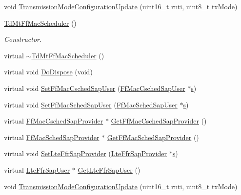 \begin{DoxyCompactItemize}
\item 
void \hyperlink{classns3_1_1TdMtFfMacScheduler_a4a7e533cdbdcd63c563baf201afee0ec}{Transmission\+Mode\+Configuration\+Update} (uint16\+\_\+t rnti, uint8\+\_\+t tx\+Mode)
\item 
\hyperlink{classns3_1_1TdMtFfMacScheduler_af9f1e76d9488fd5ea9add89d574cb90f}{Td\+Mt\+Ff\+Mac\+Scheduler} ()
\begin{DoxyCompactList}\small\item\em Constructor. \end{DoxyCompactList}\item 
virtual \hyperlink{classns3_1_1TdMtFfMacScheduler_a1ef4dda17f470bfb6e0c469afb0afc8a}{$\sim$\+Td\+Mt\+Ff\+Mac\+Scheduler} ()
\item 
virtual void \hyperlink{classns3_1_1TdMtFfMacScheduler_a7df4d0ac1213509b95b3b5b6b9b6c92b}{Do\+Dispose} (void)
\item 
virtual void \hyperlink{classns3_1_1TdMtFfMacScheduler_a274ba68426303c1a6917e959d6a51ce4}{Set\+Ff\+Mac\+Csched\+Sap\+User} (\hyperlink{classns3_1_1FfMacCschedSapUser}{Ff\+Mac\+Csched\+Sap\+User} $\ast$\hyperlink{generate__test__data__lte__sinr_8m_ad83eeb3a142285d1243a08c6b7026df8}{s})
\item 
virtual void \hyperlink{classns3_1_1TdMtFfMacScheduler_a55c35d3a14b61b7389fb108ef052b703}{Set\+Ff\+Mac\+Sched\+Sap\+User} (\hyperlink{classns3_1_1FfMacSchedSapUser}{Ff\+Mac\+Sched\+Sap\+User} $\ast$\hyperlink{generate__test__data__lte__sinr_8m_ad83eeb3a142285d1243a08c6b7026df8}{s})
\item 
virtual \hyperlink{classns3_1_1FfMacCschedSapProvider}{Ff\+Mac\+Csched\+Sap\+Provider} $\ast$ \hyperlink{classns3_1_1TdMtFfMacScheduler_a0bfda5d3c4f6d916b5e929d79570c4f4}{Get\+Ff\+Mac\+Csched\+Sap\+Provider} ()
\item 
virtual \hyperlink{classns3_1_1FfMacSchedSapProvider}{Ff\+Mac\+Sched\+Sap\+Provider} $\ast$ \hyperlink{classns3_1_1TdMtFfMacScheduler_a5640f91f6f8ab8b714d917abcbc0bb57}{Get\+Ff\+Mac\+Sched\+Sap\+Provider} ()
\item 
virtual void \hyperlink{classns3_1_1TdMtFfMacScheduler_a50c7fda519f75bdf1ab70509f6bd6cef}{Set\+Lte\+Ffr\+Sap\+Provider} (\hyperlink{classns3_1_1LteFfrSapProvider}{Lte\+Ffr\+Sap\+Provider} $\ast$\hyperlink{generate__test__data__lte__sinr_8m_ad83eeb3a142285d1243a08c6b7026df8}{s})
\item 
virtual \hyperlink{classns3_1_1LteFfrSapUser}{Lte\+Ffr\+Sap\+User} $\ast$ \hyperlink{classns3_1_1TdMtFfMacScheduler_ad303c6a5908f40eab1bea273d5199fc5}{Get\+Lte\+Ffr\+Sap\+User} ()
\item 
void \hyperlink{classns3_1_1TdMtFfMacScheduler_a4a7e533cdbdcd63c563baf201afee0ec}{Transmission\+Mode\+Configuration\+Update} (uint16\+\_\+t rnti, uint8\+\_\+t tx\+Mode)
\end{DoxyCompactItemize}

